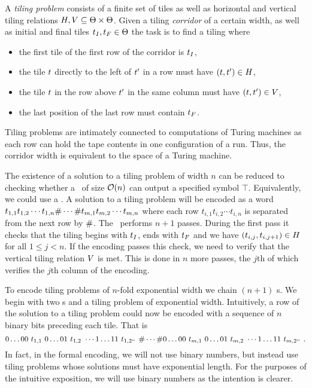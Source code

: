 A \emph{tiling problem} consists of a finite set of tiles \tiles as well as horizontal and vertical tiling relations 
$H, V \subseteq \Theta \times \Theta$.
Given a tiling \emph{corridor} of a certain width, as well as initial and final tiles
$t_I, t_F \in \Theta$
the task is to find a tiling where 
\begin{itemize}
\item
    the first tile of the first row of the corridor is $t_I$, 
\item
    the tile $t$ directly to the left of $t'$ in a row must have
    $\left( t, t' \right) \in H$,
\item
    the tile $t$ in the row above $t'$ in the same column must have
    $\left( t, t' \right) \in V$,
\item
    the last position of the last row must contain $t_F$.
\end{itemize}
Tiling problems are intimately connected to computations of Turing machines as
each row can hold the tape contents in one configuration of a run.
Thus, the corridor width is equivalent to the space of a Turing machine.

The existence of a solution to a tiling problem of width $n$ can be reduced to checking whether a \FFT\ of size 
${\mathcal{O}}\mathord{\left( n \right)}$ 
can output a specified symbol $\top$.
Equivalently, we could use a \FFA.
A solution to a tiling problem will be encoded as a word 
$t_{1,1} t_{1,2} \cdots t_{1,n} \# \cdots \# t_{m,1} t_{m,2} \cdots t_{m,n}$
where each row
$t_{i,1} t_{i,2} \cdots t_{i,n}$
is separated from the next row by $\#$.
The \FFT\ performs $n+1$ passes.
During the first pass it checks that the tiling begins with $t_I$, ends with $t_F$ and we have 
$\left( t_{i,j}, t_{i,j+1} \right) \in H$
for all
$1 \leq j < n$.
If the encoding passes this check, we need to verify that the vertical tiling relation $V$ is met.
This is done in $n$ more passes, the $j$th of which verifies the $j$th column of the encoding.

To encode tiling problems of $n$-fold exponential width we chain $(n+1)$ \FFT{}s.
We begin with two \FFT{}s and a tiling problem of exponential width.
Intuitively, a row of the solution to a tiling problem could now be encoded with a sequence of $n$ binary bits preceding each tile.
That is
\[
    0\ldots00\ \tile_{1,1}\ %
    0\ldots01\ \tile_{1,2}\ %
    \cdots
    1\ldots11\ \tile_{1,2^n}\ %
    \numsep
    \cdots
    \numsep
    0\ldots00\ \tile_{m,1}\ %
    0\ldots01\ \tile_{m,2}\ %
    \cdots
    1\ldots11\ \tile_{m,2^n} \ .
\]
In fact, in the formal encoding, we will not use binary numbers, but instead use tiling problems whose solutions must have exponential length.
For the purposes of the intuitive exposition, we will use binary numbers as the intention is clearer.

